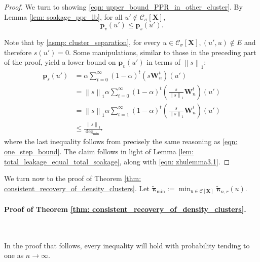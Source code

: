 \documentclass{article}
\newcommand{\norm}[1]{\left\lVert#1\right\rVert}
\newcommand{\1}{\mathbf{1}}
\newcommand{\degminpr}{\deg_{\min}'}
\newcommand{\piminwt}{\widetilde{\pibf}_{\min}}
\newcommand{\pbf}{\mathbf{p}}
\newcommand{\pibf}{\bm{\pi}}
\newcommand{\Xbf}{\mathbf{X}}
\newcommand{\Wbf}{\mathbf{W}}
\newcommand{\Cset}{\mathcal{C}}
\newcommand{\Csig}{\Cset_{\sigma}}
\theoremstyle{aldenthm}
\begin{document}
\begin{proof}
	We turn to showing \eqref{eqn: upper_bound_PPR_in_other_cluster}. By Lemma \ref{lem: soakage_ppr_lb}, for all $u' \not\in \Csig[\Xbf]$,
	\begin{equation*}
	\pbf_v(u') \leq \pbf_s(u').
	\end{equation*}
	
	Note that by \ref{asmp: cluster_separation}, for every $u \in \Csig[\Xbf], (u',u) \not\in E$ and therefore $s(u') = 0$. Some manipulations, similar to those in the preceding part of the proof, yield a lower bound on $\pbf_v(u')$ in terms of $\norm{s}_1$:
	\begin{align*}
	\pbf_s(u') & = \alpha \sum_{t = 0}^{\infty} (1 - \alpha)^t \left(s \Wbf_n^t\right)(u') \\
	& = \norm{s}_1 \alpha \sum_{t = 0}^{\infty} (1 - \alpha)^t \left(\frac{s}{\norm{s}_1} \Wbf_n^t\right)(u') \\
	& = \norm{s}_1 \alpha \sum_{t = 1}^{\infty} (1 - \alpha)^t \left(\frac{s}{\norm{s}_1} \Wbf_n^t\right)(u') \\
	& \leq \frac{\norm{s}_1}{\degminpr}
	\end{align*}
	where the last inequality follows from precisely the same reasoning as \eqref{eqn: one_step_bound}. The claim follows in light of Lemma \ref{lem: total_leakage_equal_total_soakage}, along with \eqref{eqn: zhulemma3.1}.
\end{proof}


We turn now to the proof of Theorem \ref{thm: consistent_recovery_of_density_clusters}. Let $\piminwt := \min_{u \in \Cset[\Xbf]} \widetilde{\pibf}_{n,r}(u)$.

\paragraph{Proof of Theorem \ref{thm: consistent_recovery_of_density_clusters}.}
~

In the proof that follows, every inequality will hold with probability tending to one as $n \to \infty$.
\end{document}
